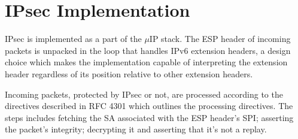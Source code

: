 \documentclass[final,a4paper,twoside,11pt,onecolumn]{report}
\begin{document}
% 
% 
% 


\section{IPsec Implementation}
IPsec is implemented as a part of the $\mu$IP stack. The ESP header of incoming packets is unpacked in the loop that handles IPv6 extension headers, a design choice which makes the implementation capable of interpreting the extension header regardless of its position relative to other extension headers.

Incoming packets, protected by IPsec or not, are processed according to the directives described in RFC 4301\citep[section 5.2]{rfc4301} which outlines the processing directives. The steps includes fetching the SA associated with the ESP header's SPI; asserting the packet's integrity; decrypting it and asserting that it's not a replay.
\end{document}
